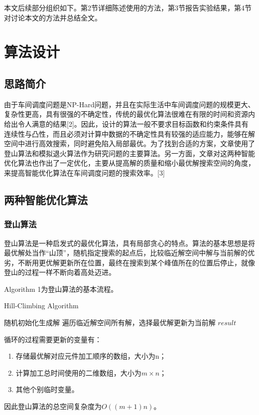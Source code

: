 \documentclass[UTF8]{ctexart}
\begin{document}
	本文后续部分组织如下。第2节详细陈述使用的方法，第3节报告实验结果，第4节对讨论本文的方法并总结全文。
	
\section{算法设计}
\subsection{思路简介}
	由于车间调度问题是NP-Hard问题，并且在实际生活中车间调度问题的规模更大、复杂性更高，具有很强的不确定性，传统的最优化算法很难在有限的时间和资源内给出令人满意的结果[2]。因此，设计的算法一般不要求目标函数和约束条件具有连续性与凸性，而且必须对计算中数据的不确定性具有较强的适应能力，能够在解空间中进行高效搜索，同时避免陷入局部最优。为了找到合适的方案，文章使用了登山算法和模拟退火算法作为研究问题的主要算法。另一方面，文章对这两种智能优化算法也作出了一定优化，主要从提高解的质量和缩小最优解搜索空间的角度，来提高智能优化算法在车间调度问题的搜索效率。[3]
\subsection{两种智能优化算法}
\subsubsection{登山算法}
登山算法是一种启发式的最优化算法，具有局部贪心的特点。算法的基本思想是将最优解处当作``山顶''，随机指定搜索的起点后，比较临近解空间中解与当前解的优劣，不断用更优解更新所在位置，最终在搜索到某个峰值所在的位置后停止，就像登山的过程一样不断向着高处迈进。

Algorithm 1为登山算法的基本流程。


\begin{algorithm}[t]
	\caption{Hill-Climbing Algorithm} %
	\begin{algorithmic}[1]
		\STATE 随机初始化生成解		
		\STATE 遍历临近解空间所有解，选择最优解更新为当前解
		\ENDWHILE 
		\ENDFOR
		\RETURN $result$
	\end{algorithmic}
\end{algorithm}

循环的过程需要更新的变量有：
\begin{enumerate}
	\item 
	存储最优解对应元件加工顺序的数组，大小为n；
	\item 
	计算加工总时间使用的二维数组，大小为\(m\times n\)；
	\item 
	其他个别临时变量。
\end{enumerate}
因此登山算法的总空间复杂度为\(O((m+1)n)\)。
\end{document}
